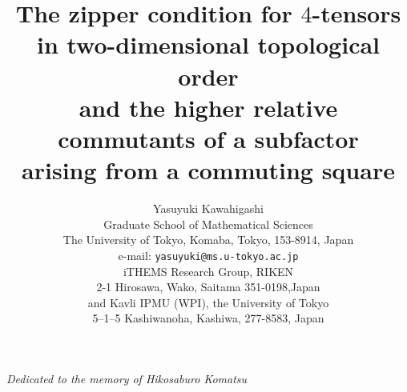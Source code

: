 \documentclass[12pt]{article}
\begin{document}
\newtheorem{theorem}{Theorem}[section]
\newtheorem{corollary}[theorem]{Corollary}
\newtheorem{lemma}[theorem]{Lemma}
\newtheorem{remark}[theorem]{Remark}
\newtheorem{example}[theorem]{Example}
\newtheorem{proposition}[theorem]{Proposition}
\newtheorem{definition}[theorem]{Definition}
\newtheorem{assumption}[theorem]{Assumption}
\def\emptyset{\varnothing}
\def\setminus{\smallsetminus}
\def\id{{\mathrm{id}}}
\def\G{{\mathcal{G}}}
\def\E{{\mathcal{E}}}
\def\H{{\mathcal{H}}}
\def\C{{\mathbb{C}}}
\def\N{{\mathbb{N}}}
\def\Q{{\mathbb{Q}}}
\def\R{{\mathbb{R}}}
\def\Z{{\mathbb{Z}}}
\def\Path{{\mathrm{Path}}}
\def\Str{{\mathrm{Str}}}
\def\st{{\mathrm{st}}}
\def\tr{{\mathrm{tr}}}
\def\opp{{\mathrm{opp}}}
\def\a{{\alpha}}
\def\be{{\beta}}
\def\de{{\delta}}
\def\e{{\varepsilon}}
\def\si{{\sigma}}
\def\la{{\lambda}}
\def\th{{\theta}}
\def\lan{{\langle}}
\def\ran{{\rangle}}
\def\isom{{\cong}}
\newcommand{\Hom}{\mathop{\mathrm{Hom}}\nolimits}
\newcommand{\End}{\mathop{\mathrm{End}}\nolimits}
\def\qed{{\unskip\nobreak\hfil\penalty50
\hskip2em\hbox{}\nobreak\hfil$\square$
\parfillskip=0pt \finalhyphendemerits=0\par}\medskip}
\def\proof{\trivlist \item[\hskip \labelsep{\bf Proof.\ }]}
\def\endproof{\null\hfill\qed\endtrivlist\noindent}

\title{The zipper condition for $4$-tensors\\
in two-dimensional topological order\\
and the higher relative commutants of a subfactor\\
arising from a commuting square}
\author{
{\sc Yasuyuki Kawahigashi}\\
{\small Graduate School of Mathematical Sciences}\\
{\small The University of Tokyo, Komaba, Tokyo, 153-8914, Japan}\\
{\small e-mail: {\tt yasuyuki@ms.u-tokyo.ac.jp}}
\\[0,40cm]
{\small iTHEMS Research Group, RIKEN}\\
{\small 2-1 Hirosawa, Wako, Saitama 351-0198,Japan}
\\[0,05cm]
{\small and}
{\small Kavli IPMU (WPI), the University of Tokyo}\\
{\small 5--1--5 Kashiwanoha, Kashiwa, 277-8583, Japan}}
\maketitle{}
\centerline{\sl Dedicated to the memory of Hikosaburo Komatsu}
\end{document}
